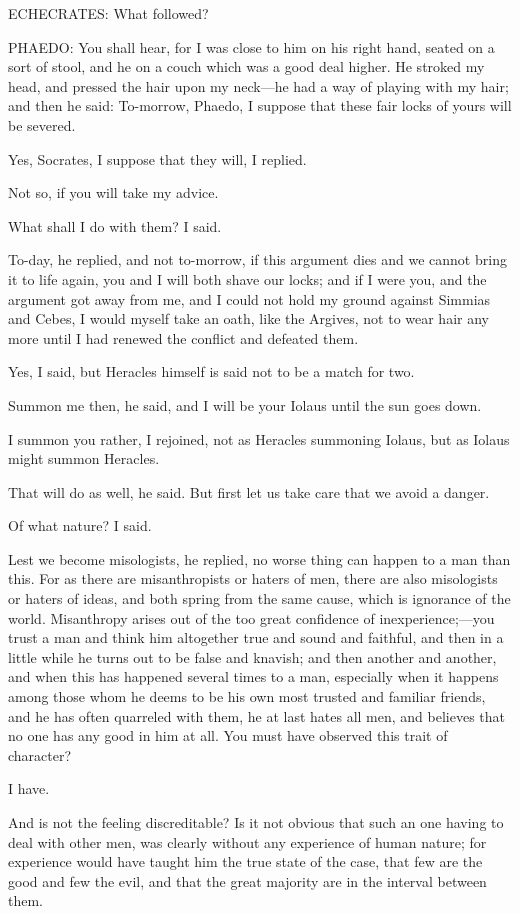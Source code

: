 ECHECRATES: What followed?

PHAEDO: You shall hear, for I was close to him on his right hand, seated
on a sort of stool, and he on a couch which was a good deal higher. He
stroked my head, and pressed the hair upon my neck—he had a way of
playing with my hair; and then he said: To-morrow, Phaedo, I suppose that
these fair locks of yours will be severed.

Yes, Socrates, I suppose that they will, I replied.

Not so, if you will take my advice.

What shall I do with them? I said.

To-day, he replied, and not to-morrow, if this argument dies and we cannot
bring it to life again, you and I will both shave our locks; and if I were
you, and the argument got away from me, and I could not hold my ground
against Simmias and Cebes, I would myself take an oath, like the Argives,
not to wear hair any more until I had renewed the conflict and defeated
them.

Yes, I said, but Heracles himself is said not to be a match for two.

Summon me then, he said, and I will be your Iolaus until the sun goes
down.

I summon you rather, I rejoined, not as Heracles summoning Iolaus, but as
Iolaus might summon Heracles.

That will do as well, he said. But first let us take care that we avoid a
danger.

Of what nature? I said.

Lest we become misologists, he replied, no worse thing can happen to a man
than this. For as there are misanthropists or haters of men, there are
also misologists or haters of ideas, and both spring from the same cause,
which is ignorance of the world. Misanthropy arises out of the too great
confidence of inexperience;—you trust a man and think him altogether
true and sound and faithful, and then in a little while he turns out to be
false and knavish; and then another and another, and when this has
happened several times to a man, especially when it happens among those
whom he deems to be his own most trusted and familiar friends, and he has
often quarreled with them, he at last hates all men, and believes that no
one has any good in him at all. You must have observed this trait of
character?

I have.

And is not the feeling discreditable? Is it not obvious that such an one
having to deal with other men, was clearly without any experience of human
nature; for experience would have taught him the true state of the case,
that few are the good and few the evil, and that the great majority are in
the interval between them.

